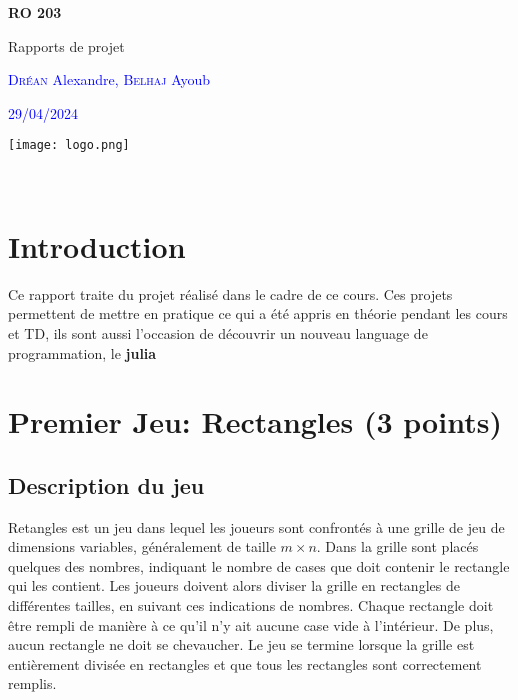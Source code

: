 \documentclass[a4paper,12pt,titlepage,leqno]{article}
\newcommand{\Course}{RO 203}
\newcommand{\Title}{Rapports de projet}
\newcommand{\Authors}{ \textsc{Dréan} Alexandre, \textsc{Belhaj} Ayoub}
\newcommand{\Date}{29/04/2024}
\begin{document}
\begin{titlepage}
\vspace*{\fill}
\centering
{\Large\bfseries\textcolor{deepblue}{\Course}\par}
\vspace{0.2in}
{\huge\textcolor{deepblue}{\Title} \par}
\vspace{0.5in}
{\Large\textcolor{blue}{\Authors}\par}
\vspace{0.2in}
{\textcolor{blue}{\Date} \par}
\vspace{0.5in}
\texttt{[image: logo.png]}
\vspace*{\fill}
\end{titlepage}

\setcounter{page}{2}
\tableofcontents
~
\newpage


\section*{Introduction}
Ce rapport traite du projet réalisé dans le cadre de ce cours. Ces projets permettent de mettre en pratique ce qui a été appris en théorie pendant les cours et TD, ils sont aussi l'occasion de découvrir un nouveau language de programmation, le \textbf{julia} 


\section{Premier Jeu: Rectangles (3 points)}\label{sec::1}

\subsection{Description du jeu}

Retangles est un jeu dans lequel les joueurs sont confrontés à une grille de jeu de dimensions variables, généralement de taille \( m \times n \). Dans la grille sont placés quelques des nombres, indiquant le nombre de cases que doit contenir le rectangle qui les contient. Les joueurs doivent alors diviser la grille en rectangles de différentes tailles, en suivant ces indications de nombres. Chaque rectangle doit être rempli de manière à ce qu'il n'y ait aucune case vide à l'intérieur. De plus, aucun rectangle ne doit se chevaucher. Le jeu se termine lorsque la grille est entièrement divisée en rectangles et que tous les rectangles sont correctement remplis.
\end{document}
